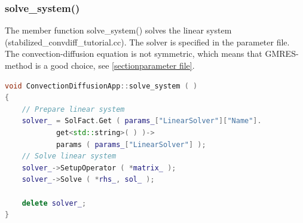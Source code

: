 \documentclass[a4paper, 11pt, twoside]{article}
\begin{document}
\subsubsection{solve\_system()}\label{sec:solve}
The member function solve\_system() solves  the linear system (stabilized\_convdiff\_tutorial.cc). The solver is specified in the parameter file. The convection-diffusion equation is not symmetric, which means that GMRES-method is a good choice, see \ref{sectionparameter file}.
\begin{lstlisting}[language=C++, basicstyle={\footnotesize, \ttfamily}, keywordstyle=\color{blue}, numbers=none, tabsize=4]
void ConvectionDiffusionApp::solve_system ( )
{
    // Prepare linear system
    solver_ = SolFact.Get ( params_["LinearSolver"]["Name"].
            get<std::string>( ) )->
            params ( params_["LinearSolver"] );
    // Solve linear system
    solver_->SetupOperator ( *matrix_ );
    solver_->Solve ( *rhs_, sol_ );

    delete solver_;
}
\end{lstlisting}
\end{document}
